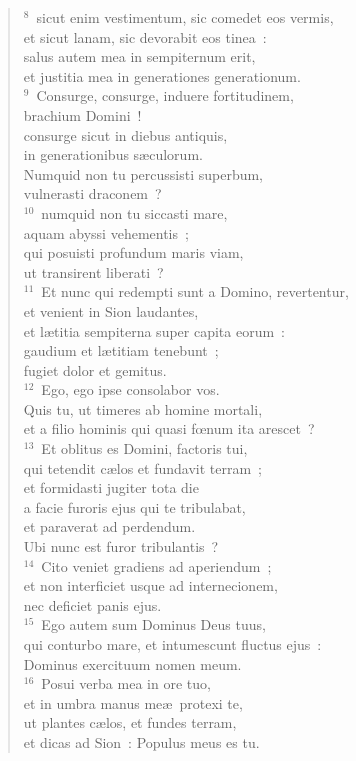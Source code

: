 \begin{verse}
${}^{8}$~sicut enim vestimentum, sic comedet eos vermis,\\ et sicut lanam, sic devorabit eos tinea~:\\ salus autem mea in sempiternum erit,\\ et justitia mea in generationes generationum.\\
${}^{9}$~Consurge, consurge, induere fortitudinem,\\ brachium Domini~!\\ consurge sicut in diebus antiquis,\\ in generationibus s\ae culorum.\\ Numquid non tu percussisti superbum,\\ vulnerasti draconem~?\\
${}^{10}$~numquid non tu siccasti mare,\\ aquam abyssi vehementis~;\\ qui posuisti profundum maris viam,\\ ut transirent liberati~?\\
${}^{11}$~Et nunc qui redempti sunt a Domino, revertentur,\\ et venient in Sion laudantes,\\ et l\ae titia sempiterna super capita eorum~:\\ gaudium et l\ae titiam tenebunt~;\\ fugiet dolor et gemitus.\\
${}^{12}$~Ego, ego ipse consolabor vos.\\ Quis tu, ut timeres ab homine mortali,\\ et a filio hominis qui quasi fœnum ita arescet~?\\
${}^{13}$~Et oblitus es Domini, factoris tui,\\ qui tetendit c\ae los et fundavit terram~;\\ et formidasti jugiter tota die\\ a facie furoris ejus qui te tribulabat,\\ et paraverat ad perdendum.\\ Ubi nunc est furor tribulantis~?\\
${}^{14}$~Cito veniet gradiens ad aperiendum~;\\ et non interficiet usque ad internecionem,\\ nec deficiet panis ejus.\\
${}^{15}$~Ego autem sum Dominus Deus tuus,\\ qui conturbo mare, et intumescunt fluctus ejus~:\\ Dominus exercituum nomen meum.\\
${}^{16}$~Posui verba mea in ore tuo,\\ et in umbra manus me\ae\ protexi te,\\ ut plantes c\ae los, et fundes terram,\\ et dicas ad Sion~: Populus meus es tu.\end{verse}


